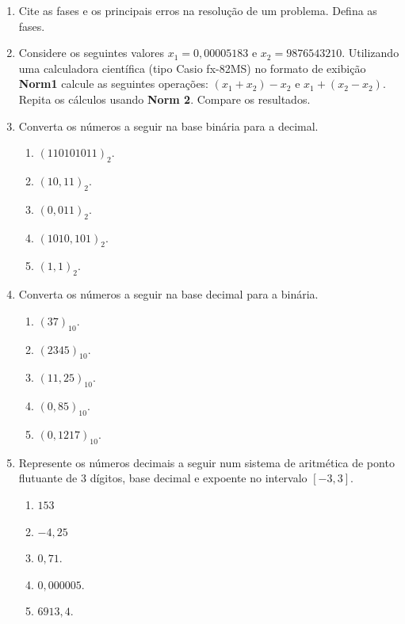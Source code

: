 \documentclass[12pt,a4paper]{book}
\begin{document}
\begin{enumerate}
    \item Cite as fases e os principais erros na resolução de um problema. Defina as fases.

    \item Considere os seguintes valores $x_1=0,00005183$ e $x_2=9876543210$. Utilizando uma calculadora científica (tipo Casio fx-82MS) no formato de exibição \textbf{Norm1} calcule as seguintes operações: $(x_1+x_2)-x_2$ e $x_1+(x_2-x_2)$. Repita os cálculos usando \textbf{Norm 2}. Compare os resultados.

    \item Converta os números a seguir na base binária para a decimal.
        \begin{enumerate}
            \item $(110101011)_2$.
            \item $(10,11)_2$.
            \item $(0,011)_2$.
            \item $(1010,101)_2$.
            \item $(1,1)_2$.
        \end{enumerate}

    \item Converta os números a seguir na base decimal para a binária.
        \begin{enumerate}
            \item $(37)_{10}$.
            \item $(2345)_{10}$.
            \item $(11,25)_{10}$.
            \item $(0,85)_{10}$.
            \item $(0,1217)_{10}$.
        \end{enumerate}

    \item Represente os números decimais a seguir num sistema de aritmética de ponto flutuante de 3 dígitos, base decimal e expoente no intervalo $[-3, 3]$.
        \begin{enumerate}
            \item $153$
            \item $-4,25$
            \item $0,71$.
            \item $0,000005$.
            \item $6913,4$.
        \end{enumerate}


\end{enumerate}
\end{document}

